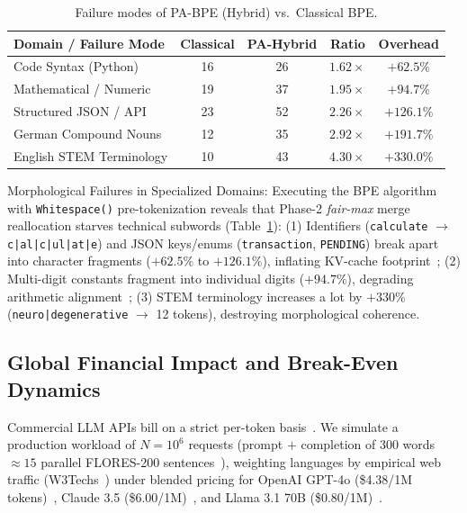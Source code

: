 \documentclass[sigconf,nonacm]{acmart}
\begin{document}
\begin{table}[t]
\centering
\caption{Failure modes of PA-BPE (Hybrid) vs.\ Classical BPE.}
\vspace{-0.6em}
\footnotesize
\setlength{\tabcolsep}{3.5pt}
\begin{tabular}{lcccc}
\toprule
\textbf{Domain / Failure Mode} & \textbf{Classical} & \textbf{PA-Hybrid} & \textbf{Ratio} & \textbf{Overhead} \\
\midrule
Code Syntax (Python)       & 16 & 26 & $1.62\times$ & $+62.5\%$  \\
Mathematical / Numeric     & 19 & 37 & $1.95\times$ & $+94.7\%$  \\
Structured JSON / API      & 23 & 52 & $2.26\times$ & $+126.1\%$ \\
German Compound Nouns      & 12 & 35 & $2.92\times$ & $+191.7\%$ \\
English STEM Terminology   & 10 & 43 & $4.30\times$ & $+330.0\%$ \\
\bottomrule
\end{tabular}
\vspace{-0.8em}
\label{tab:failure_modes}
\end{table}

{Morphological Failures in Specialized Domains:} Executing the BPE algorithm with \texttt{Whitespace()} pre-tokenization reveals that Phase-2 \textit{fair-max} merge reallocation starves technical subwords (Table~\ref{tab:failure_modes}):
(1) Identifiers (\texttt{calculate} $\rightarrow$ \texttt{c|al|c|ul|at|e}) and JSON keys/enums (\texttt{transaction}, \texttt{PENDING}) break apart into character fragments ($+62.5\%$ to $+126.1\%$), inflating KV-cache footprint~\cite{petrov2023language,ahia2023all};
(2) Multi-digit constants fragment into individual digits ($+94.7\%$), degrading arithmetic alignment~\cite{singh2024tokenization};
(3) STEM terminology increases a lot by $+330\%$ (\texttt{neuro|degenerative} $\rightarrow$ 12 tokens), destroying morphological coherence.

\subsection{Global Financial Impact and Break-Even Dynamics}
\label{sec:financial_impact}

Commercial LLM APIs bill on a strict per-token basis~\cite{ahia2023all,openai2024gpt4o}. We simulate a production workload of $N = 10^6$ requests (prompt $+$ completion of 300 words $\approx 15$ parallel FLORES-200 sentences~\cite{goyal2022flores}), weighting languages by empirical web traffic (W3Techs~\cite{w3techs2024languages}) under blended pricing for OpenAI GPT-4o (\$4.38/1M tokens)~\cite{openai2024gpt4o}, Claude 3.5 (\$6.00/1M)~\cite{anthropic2024claude}, and Llama 3.1 70B (\$0.80/1M)~\cite{meta2024llama3}.
\end{document}
